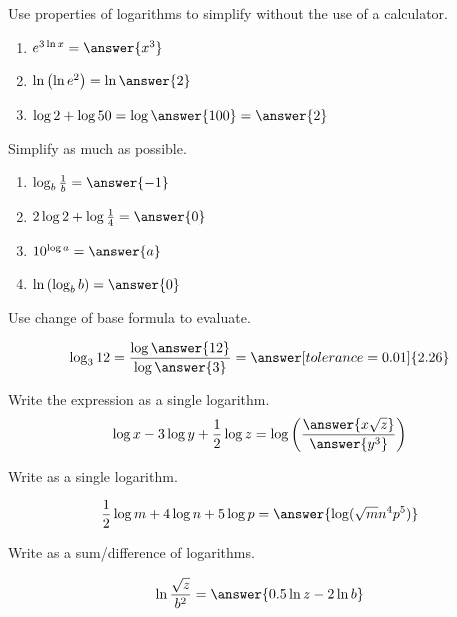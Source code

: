 \documentclass{ximera}
\begin{document}
 
  \begin{problem}\label{prob:160hom8prob1} 
Use properties of logarithms to simplify without the use of a calculator.
\begin{enumerate}
    \item $e^{3\ln x}=\answer{x^3}$
    \item $\ln\left(\ln e^2\right)=\ln\answer{2}$
    \item $\log 2 +\log 50=\log \answer{100}=\answer{2}$
\end{enumerate}
\end{problem}

\begin{problem}\label{prob:160hom8prob8}
 Simplify as much as possible.
 \begin{enumerate}
     \item $\log_b \frac{1}{b}=\answer{-1}$
     \item $2\log 2+\log\frac{1}{4}=\answer{0}$
     \item $10^{\log a}=\answer{a}$
     \item $\ln\left(\log_b b\right)=\answer{0}$
 \end{enumerate}
 \end{problem}

\begin{problem}\label{prob:160hom8prob2}
Use change of base formula to evaluate. 

$$\log_3 12=\frac{\log\answer{12}}{\log\answer{3}}=\answer[tolerance=0.01]{2.26}$$
\end{problem}

\begin{problem}\label{prob:160hom8prob3}
Write the expression as a single logarithm.
$$\log x-3\log y+\frac{1}{2}\log z=\log\left(\frac{\answer{x\sqrt{z}}}{\answer{y^3}}\right)$$
\end{problem}

\begin{problem}\label{prob:160hom8prob10}
 Write as a single logarithm.
 
 $$\frac{1}{2}\log m+4\log n+5\log p=\answer{\log(\sqrt{m}n^4p^5)}$$
 \end{problem}
 
 \begin{problem}\label{prob:160hom8prob11}
 Write as a sum/difference of logarithms.
 
 $$\ln \frac{\sqrt{z}}{b^2}=\answer{0.5\ln z-2\ln b}$$
 \end{problem}
 

 
\end{document}
